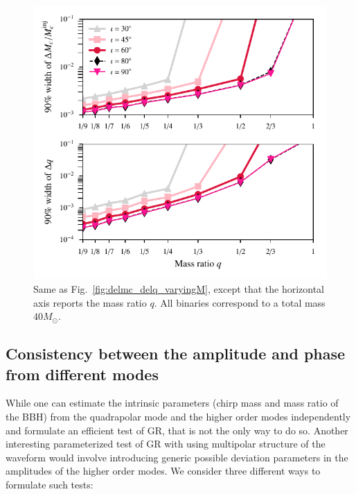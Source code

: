 \documentclass[prd,preprintnumbers,twocolumn,eqsecnum,floatfix,a4paper,nofootinbib,superscriptaddress]{revtex4}
\begin{document}
 \begin{figure}[tbh]
 	\begin{center}
 		\includegraphics[scale=0.8]{figs/hm_9dim_dmcbymcinj_dq_diff_q.pdf}
 	\end{center} 
 	\caption{Same as Fig.~\ref{fig:delmc_delq_varyingM}, except that the horizontal axis reports the mass ratio $q$. All binaries correspond to a total mass $40M_{\odot}$.}
 	\label{fig:delmc_delq_varyingq}
 \end{figure}
\subsection{Consistency between the amplitude and phase from different modes}
\label{sec3b}
While one can estimate the intrinsic parameters (chirp mass and mass ratio of the BBH) from the quadrapolar mode and the higher order modes independently and formulate an efficient test of GR, that is not the only way to do so. Another interesting parameterized test of GR with using multipolar structure of the waveform would involve introducing generic possible deviation parameters in the amplitudes of the higher order modes. We consider three different  ways to formulate such tests:
\end{document}
